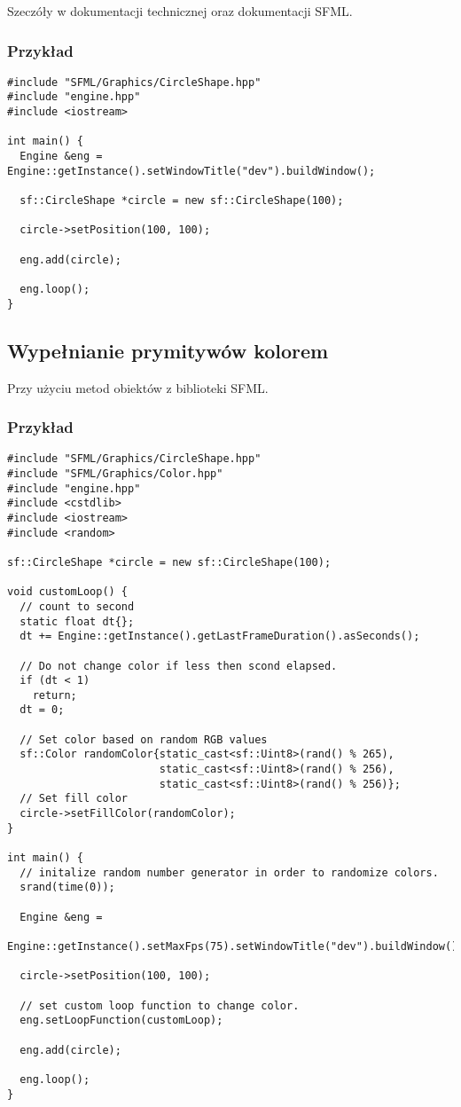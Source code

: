 \documentclass[11pt]{article}
\begin{document}
Szeczóły w dokumentacji technicznej oraz dokumentacji SFML.
\subsubsection{Przykład}
\label{sec:org3c0a5df}
\begin{verbatim}
#include "SFML/Graphics/CircleShape.hpp"
#include "engine.hpp"
#include <iostream>

int main() {
  Engine &eng = Engine::getInstance().setWindowTitle("dev").buildWindow();

  sf::CircleShape *circle = new sf::CircleShape(100);

  circle->setPosition(100, 100);

  eng.add(circle);

  eng.loop();
}
\end{verbatim}
\subsection{Wypełnianie prymitywów kolorem}
\label{sec:orgbac75d8}
Przy użyciu metod obiektów z biblioteki SFML.
\subsubsection{Przykład}
\label{sec:org7046b3b}
\begin{verbatim}
#include "SFML/Graphics/CircleShape.hpp"
#include "SFML/Graphics/Color.hpp"
#include "engine.hpp"
#include <cstdlib>
#include <iostream>
#include <random>

sf::CircleShape *circle = new sf::CircleShape(100);

void customLoop() {
  // count to second
  static float dt{};
  dt += Engine::getInstance().getLastFrameDuration().asSeconds();

  // Do not change color if less then scond elapsed.
  if (dt < 1)
    return;
  dt = 0;

  // Set color based on random RGB values
  sf::Color randomColor{static_cast<sf::Uint8>(rand() % 265),
                        static_cast<sf::Uint8>(rand() % 256),
                        static_cast<sf::Uint8>(rand() % 256)};
  // Set fill color
  circle->setFillColor(randomColor);
}

int main() {
  // initalize random number generator in order to randomize colors.
  srand(time(0));

  Engine &eng =
      Engine::getInstance().setMaxFps(75).setWindowTitle("dev").buildWindow();

  circle->setPosition(100, 100);

  // set custom loop function to change color.
  eng.setLoopFunction(customLoop);

  eng.add(circle);

  eng.loop();
}
\end{verbatim}
\end{document}
